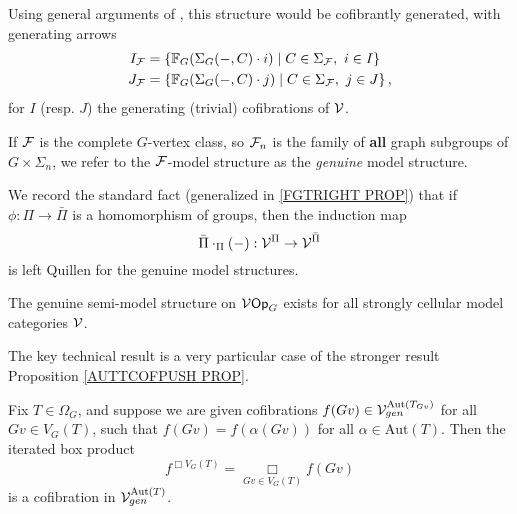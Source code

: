 \documentclass[a4paper,10pt]{article}%
\begin{document}
Using general arguments of \cite{Hi03}, this structure would be cofibrantly generated, with generating arrows 
\begin{align*} 
  I_{\mathcal F} &= \left\{ \mathbb F_G(\Sigma_G(-,C) \cdot i) \;|\; C \in \Sigma_{\mathcal F},\ i\in I\right\}\\ 
  J_{\mathcal F} &= \left\{ \mathbb F_G(\Sigma_G(-,C) \cdot j) \;|\; C \in \Sigma_{\mathcal F},\ j\in J\right\}, 
\end{align*} 
for $I$ (resp. $J$) the generating (trivial) cofibrations of $\mathcal V$. 

\begin{definition} 
  If $\mathcal F$ is the complete $G$-vertex class, so $\mathcal F_n$ is the family of \textbf{all} graph subgroups of $G\times \Sigma_n$, we refer to the $\mathcal F$-model structure as the \textit{genuine} model structure. 
\end{definition} 

\begin{remark}\label{GENUINE FGTRIGHT REMARK} 
  We record the standard fact (generalized in \ref{FGTRIGHT PROP}) that if $\phi: \Pi \to \bar \Pi$ is a homomorphism of groups, then the induction map 
  \[ 
  \bar\Pi\cdot_\Pi(-): \mathcal V^\Pi \to \mathcal V^{\bar \Pi} 
  \] 
  is left Quillen for the genuine model structures. 
\end{remark} 

\begin{theorem}\label{GENUINE_SEMI_VOP_G_THM} 
  The genuine semi-model structure on $\mathcal V\mathsf{Op}_G$ exists for all strongly cellular model categories $\mathcal V$.
\end{theorem} 

The key technical result is a very particular case of the stronger result Proposition \ref{AUTTCOFPUSH PROP}.  

\begin{proposition}\label{GENUINE_TREE_BOX_COFIBRANT_PROP} 
  Fix $T\in \Omega_G$, and suppose we are given cofibrations $f(Gv) \in \mathcal V^{\mathrm{Aut}(T_{Gv})}_{gen}$ for all $Gv\in V_G(T)$, such that $f(Gv) = f(\alpha(Gv))$ for all $\alpha\in \mathrm{Aut}(T)$. Then the iterated box product 
  \[ 
  f^{\Box V_G(T)} = \mathop{\Box}\limits_{Gv \in V_G(T)} f(Gv) 
  \] 
  is a cofibration in $\mathcal V^{\mathrm{Aut}(T)}_{gen}$.  
\end{proposition} 
\end{document}
